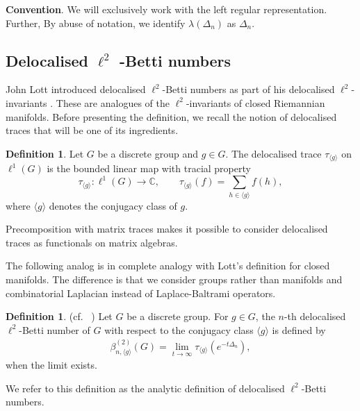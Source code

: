 \documentclass[a4paper,leqno,12pt]{article}
\numberwithin{equation}{section}
\theoremstyle{plain}
\theoremstyle{definition}
\newtheorem{definition}[theoremcounter]{Definition}
\theoremstyle{remark}
\begin{document}
	\textbf{Convention}. We will exclusively work with the left regular representation. Further, By abuse of notation, we identify $\lambda(\Delta_n)$ as $\Delta_n$.
	
	\subsection{Delocalised 
		\texorpdfstring{$\ell^2$}{l²}
		-Betti numbers}\label{subsec:deloc l2}
	John Lott introduced  delocalised $\ell^2$-Betti numbers as part of his delocalised $\ell^2$-invariants \cite{lott1999}. These are analogues of the 
	$\ell^2$-invariants of closed Riemannian manifolds. Before presenting the definition, we recall the notion of delocalised traces that will be one of its ingredients.
	
	\begin{definition}
		Let $G$ be a discrete group and $g\in G$. The delocalised trace  $\tau_{\langle g\rangle}$ on $\ell^1(G)$ is the bounded linear map with tracial property 
		\[
		\tau_{\langle g\rangle}: \ell^1(G)\rightarrow \mathbb C, \qquad 
		\tau_{\langle g\rangle}(f)= \sum_{h\in \langle g\rangle}f(h),
		\]
		where $\langle g\rangle$ denotes the conjugacy class of $g$.
	\end{definition}
    Precomposition with matrix traces makes it possible to consider delocalised traces as functionals on matrix algebras.
	
	The following analog is in complete analogy with Lott's definition for closed  manifolds. The difference is that we consider groups rather than manifolds and combinatorial Laplacian instead of Laplace-Baltrami operators. 
	
	
	\begin{definition}  \label{def: lott deloc betti numbers} {(cf.~ \cite[Definition 3]{lott1999})}
		Let $G$ be a discrete group. For $g\in G$, the $n$-th delocalised $\ell^2$-Betti number of $G$ with respect to the conjugacy class $\langle g\rangle$ is defined by
		\begin{gather}\label{analytic def}
		\beta ^{(2)}_{n, \langle g\rangle}(G) = \lim_{t \to \infty} \tau_{\langle g\rangle}(e^{-t \Delta_n}),
		\end{gather}
		when the limit exists.
	\end{definition}
	We refer to this definition as the analytic definition of delocalised $\ell^2$-Betti numbers.
 
\end{document}
